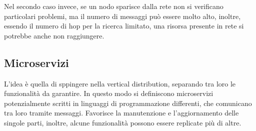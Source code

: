 Nel secondo caso invece, se un nodo sparisce dalla rete non si verificano 
particolari problemi, ma il numero di messaggi può essere molto alto, 
inoltre, essendo il numero di hop per la ricerca limitato, una risorsa 
presente in rete si potrebbe anche non raggiungere.

\subsection{Microservizi}
L'idea è quella di sppingere nella vertical distribution, separando 
tra loro le funzionalità da garantire. In questo modo si definiscono microservizi
potenzialmente scritti in linguaggi di programmazione differenti, che comunicano 
tra loro tramite messaggi.
Favorisce la manutenzione e l'aggiornamento delle singole parti, inoltre, 
alcune funzionalità possono essere replicate più di altre.

